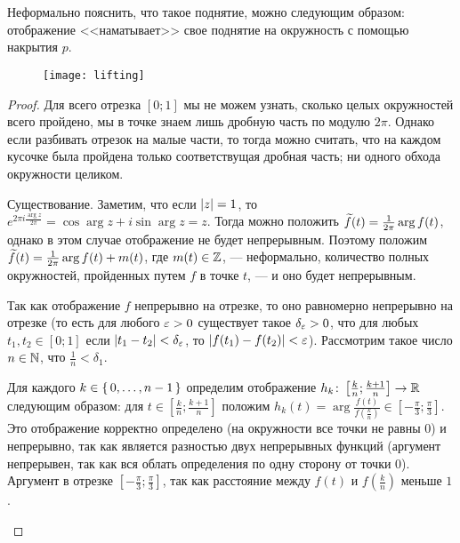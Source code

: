 \documentclass[main]{subfiles}
\begin{document}

\section{}

Неформально пояснить, что такое поднятие, можно следующим образом: отображение <<наматывает>> свое поднятие на
окружность с помощью накрытия $ p $.

\begin{figure}[H]
	\centering \texttt{[image: lifting]}
\end{figure}

\LiftExists

\begin{proof}
	Для всего отрезка $ [0; 1] $ мы не можем узнать, сколько целых окружностей всего пройдено, мы в
	точке знаем лишь дробную часть по модулю $ 2 \pi $. Однако если разбивать отрезок на малые
	части, то тогда можно считать, что на каждом кусочке была пройдена только соответствущая дробная часть;
	ни одного обхода окружности целиком.
	\begin{phased}
		\item[Существование.]
			Заметим, что если $ \left\vert z\right\vert = 1 $, то
			$ e^{2 \pi i \frac{\arg z}{2 \pi}} = \cos \arg z + i \sin \arg z = z $. Тогда можно положить
			$ \widetilde{f}(t) = \frac{1}{2 \pi} \arg f(t) $, однако в этом случае отображение не будет непрерывным.
			Поэтому положим $ \widetilde{f}(t) = \frac{1}{2 \pi} \arg f(t) + m(t) $, где $ m(t) \in \mathbb{Z} $, --- неформально,
			количество полных окружностей, пройденных путем $ f $ в точке $ t $, --- и оно будет непрерывным.

			Так как отображение $ f $ непрерывно на отрезке, то оно равномерно непрерывно на
			отрезке (то есть для любого $ \varepsilon > 0 $ существует такое $ \delta_\varepsilon > 0 $, что для любых
			$ t_1, t_2 \in [0; 1] $ если $ \left\vert t_1 - t_2\right\vert < \delta_\varepsilon $, то $ \left\vert f(t_1) - f(t_2)\right\vert < \varepsilon $).
			Рассмотрим такое число $ n \in \mathbb{N} $, что $ \frac{1}{n} < \delta_1 $.

			Для каждого
			$ k \in \left\{\,0, \ldots, n - 1\,\right\} $ определим отображение
			$ h_k \colon \left[ \frac{k}{n}; \frac{k+1}{n} \right] \to \mathbb{R} $ следующим образом: для
			$ t \in \left[ \frac{k}{n}; \frac{k+1}{n} \right] $ положим
				$ h_k(t) = \arg \frac{f(t)}{f \left( \frac{k}{n} \right)}
				\in \left[ -\frac{\pi}{3}; \frac{\pi}{3} \right] $.
			Это отображение корректно определено (на окружности все точки не равны 0) и непрерывно,
			так как является разностью двух непрерывных функций (аргумент непрерывен, так как вся облать определения
			по одну сторону от точки 0). Аргумент в отрезке $ \left[ -\frac{\pi}{3}; \frac{\pi}{3} \right] $, так как
			расстояние между $ f(t) $ и $ f \left( \frac{k}{n} \right) $ меньше $ 1 $.


\end{phased}
\end{proof}
\end{document}
